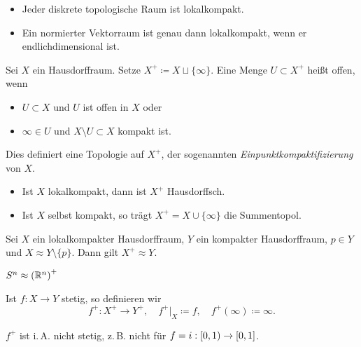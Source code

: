 \documentclass{cheat-sheet}
\begin{document}
\begin{bspe}
  \begin{itemize}
    \item Jeder diskrete topologische Raum ist lokalkompakt.
    \item Ein normierter Vektorraum ist genau dann lokalkompakt, wenn er endlichdimensional ist.
  \end{itemize}
\end{bspe}

\begin{defn}
  Sei $X$ ein Hausdorffraum. Setze $X^+ \coloneqq X \sqcup \{ \infty \}$. Eine Menge $U \subset X^+$ heißt offen, wenn
  \begin{itemize}
    \item $U \subset X$ und $U$ ist offen in $X$ oder
    \item $\infty \in U$ und $X \setminus U \subset X$ kompakt ist.
  \end{itemize}
  Dies definiert eine Topologie auf $X^+$, der sogenannten \emph{Einpunktkompaktifizierung} von $X$.
\end{defn}

\begin{bem}
  \begin{itemize}
    \item Ist $X$ lokalkompakt, dann ist $X^+$ Hausdorffsch.
    \item Ist $X$ selbst kompakt, so trägt $X^+ = X \cup \{ \infty \}$ die Summentopol.
  \end{itemize}
\end{bem}

\begin{prop}
  Sei $X$ ein lokalkompakter Hausdorffraum, $Y$ ein kompakter Hausdorffraum, $p \in Y$ und $X \approx Y \setminus \{ p \}$. Dann gilt $X^+ \approx Y$.
\end{prop}

\begin{kor}
  $S^n \approx \left(\mathbb{R}^n\right)^+$
\end{kor}

\begin{nota}
  Ist $f : X \to Y$ stetig, so definieren wir
  \[ f^+ : X^+ \to Y^+, \quad f^+|_X \coloneqq f, \quad f^+(\infty) \coloneqq \infty. \]
\end{nota}

\begin{bem}
  $f^+$ ist i.\,A. nicht stetig, z.\,B. nicht für $f = i : \left[ 0, 1 \right) \to \left[ 0, 1 \right]$.
\end{bem}
\end{document}
